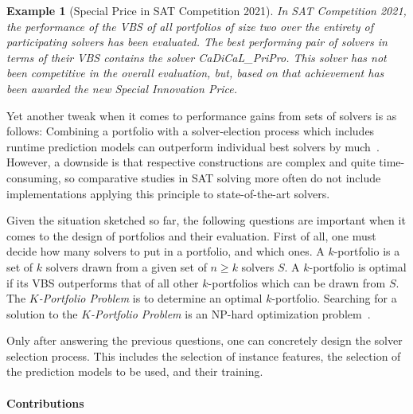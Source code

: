 \documentclass[conference]{IEEEtran}
\newtheorem{example}{Example}
\begin{document}
\begin{example}[Special Price in SAT Competition 2021]
In SAT Competition 2021, the performance of the VBS of all portfolios of size two over the entirety of participating solvers has been evaluated. 
The best performing pair of solvers in terms of their VBS contains the solver \emph{CaDiCaL\_PriPro}. This solver has not been competitive in the overall evaluation, but, based on that achievement has been awarded the new \emph{Special Innovation Price}.
\end{example}

Yet another tweak when it comes to performance gains from sets of solvers is as follows: Combining a portfolio with a solver-election process which includes runtime prediction models can outperform individual best solvers by much~\cite{xu2008satzilla}. 
However, a downside is that respective constructions are complex and quite time-consuming, so comparative studies in SAT solving more often do not include implementations applying this principle to state-of-the-art solvers.

Given the situation sketched so far, the following questions are important when it comes to the design of portfolios and their evaluation. 
First of all, one must decide how many solvers to put in a portfolio, and which ones. 
A $k$-portfolio is a set of $k$ solvers drawn from a given set of $n \geq k$ solvers $S$. 
A $k$-portfolio is optimal if its VBS outperforms that of all other $k$-portfolios which can be drawn from $S$. 
The \emph{$K$-Portfolio Problem} is to determine an optimal $k$-portfolio. 
Searching for a solution to the \emph{$K$-Portfolio Problem} is an NP-hard optimization problem~\cite{nof2020real}. 

Only after answering the previous questions, one can concretely design the solver selection process. 
This includes the selection of instance features, the selection of the prediction models to be used, and their training. 


\paragraph{Contributions}
\end{document}
